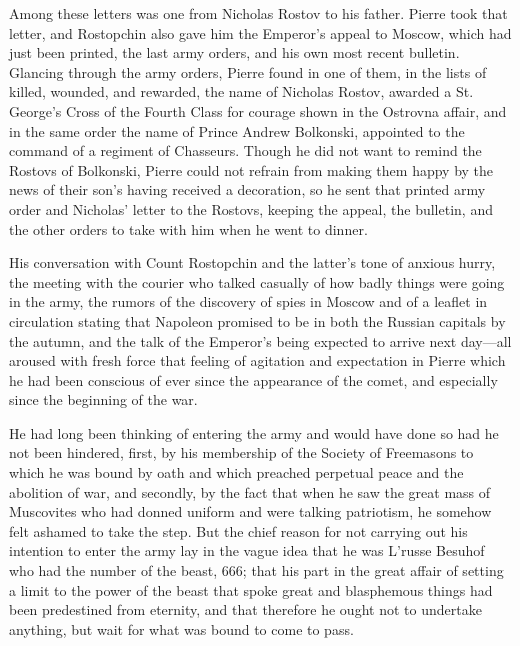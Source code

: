 Among these letters was one from Nicholas Rostov to his
father. Pierre took that letter, and Rostopchin also gave him the
Emperor's appeal to Moscow, which had just been printed, the last
army orders, and his own most recent bulletin. Glancing through
the army orders, Pierre found in one of them, in the lists of
killed, wounded, and rewarded, the name of Nicholas Rostov,
awarded a St. George's Cross of the Fourth Class for courage
shown in the Ostrovna affair, and in the same order the name of
Prince Andrew Bolkonski, appointed to the command of a regiment
of Chasseurs. Though he did not want to remind the Rostovs of
Bolkonski, Pierre could not refrain from making them happy by the
news of their son's having received a decoration, so he sent that
printed army order and Nicholas' letter to the Rostovs, keeping
the appeal, the bulletin, and the other orders to take with him
when he went to dinner.

His conversation with Count Rostopchin and the latter's tone of
anxious hurry, the meeting with the courier who talked casually
of how badly things were going in the army, the rumors of the
discovery of spies in Moscow and of a leaflet in circulation
stating that Napoleon promised to be in both the Russian capitals
by the autumn, and the talk of the Emperor's being expected to
arrive next day---all aroused with fresh force that feeling of
agitation and expectation in Pierre which he had been conscious
of ever since the appearance of the comet, and especially since
the beginning of the war.

He had long been thinking of entering the army and would have
done so had he not been hindered, first, by his membership of the
Society of Freemasons to which he was bound by oath and which
preached perpetual peace and the abolition of war, and secondly,
by the fact that when he saw the great mass of Muscovites who had
donned uniform and were talking patriotism, he somehow felt
ashamed to take the step. But the chief reason for not carrying
out his intention to enter the army lay in the vague idea that he
was L'russe Besuhof who had the number of the beast, 666; that
his part in the great affair of setting a limit to the power of
the beast that spoke great and blasphemous things had been
predestined from eternity, and that therefore he ought not to
undertake anything, but wait for what was bound to come to pass.


